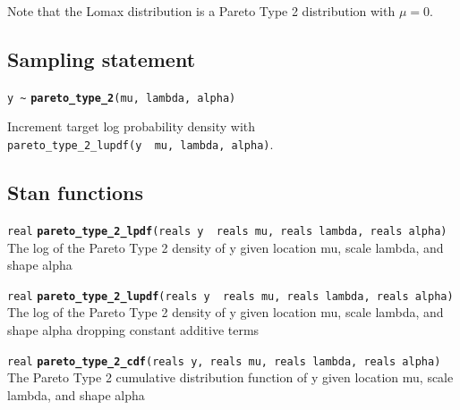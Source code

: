 \documentclass[
  10pt,
]{book}
\begin{document}
Note that the Lomax distribution is a Pareto Type 2 distribution with
\(\mu=0\).

\hypertarget{sampling-statement-43}{%
\subsection{Sampling statement}\label{sampling-statement-43}}

\texttt{y\ \textasciitilde{}} \textbf{\texttt{pareto\_type\_2}}\texttt{(mu,\ lambda,\ alpha)}

Increment target log probability density with \texttt{pareto\_type\_2\_lupdf(y\ \textbar{}\ mu,\ lambda,\ alpha)}.

\hypertarget{stan-functions-42}{%
\subsection{Stan functions}\label{stan-functions-42}}


\texttt{real} \textbf{\texttt{pareto\_type\_2\_lpdf}}\texttt{(reals\ y\ \textbar{}\ reals\ mu,\ reals\ lambda,\ reals\ alpha)}\newline
The log of the Pareto Type 2 density of y given location mu, scale
lambda, and shape alpha


\texttt{real} \textbf{\texttt{pareto\_type\_2\_lupdf}}\texttt{(reals\ y\ \textbar{}\ reals\ mu,\ reals\ lambda,\ reals\ alpha)}\newline
The log of the Pareto Type 2 density of y given location mu, scale
lambda, and shape alpha dropping constant additive terms


\texttt{real} \textbf{\texttt{pareto\_type\_2\_cdf}}\texttt{(reals\ y,\ reals\ mu,\ reals\ lambda,\ reals\ alpha)}\newline
The Pareto Type 2 cumulative distribution function of y given location
mu, scale lambda, and shape alpha

\end{document}
